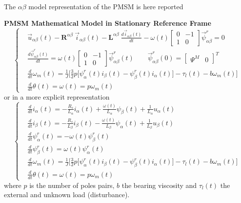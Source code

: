 \documentclass[11pt,a4paper]{scrartcl}
\numberwithin{equation}{section}
\theoremstyle{it}
\theoremstyle{definition}
\begin{document}
\begin{onehalfspace}
The $\alpha\beta$ model representation of the PMSM is here reported
\begin{mybox}
	\textbf{PMSM Mathematical Model in Stationary Reference Frame}
	\begin{equation}\label{pmsm_problem_1_eq_1}
		\left\lbrace \begin{aligned}
			& \vec{u}_{\alpha\beta}(t)-\mathbf{R}^{\alpha\beta}\ 
			\vec{i}_{\alpha\beta}(t)-\mathbf{L}^{\alpha\beta}\ 
			\frac{d\vec{i}_{\alpha\beta}(t)}{dt}-\omega(t) \begin{bmatrix} 
				0 & -1 \\ 1 & 0\end{bmatrix} \vec{\psi}^r_{\alpha\beta} = 0 
			\\[6pt]
			& \frac{d\vec{\psi}^r_{\alpha\beta}(t)}{dt} = \omega(t) 
			\begin{bmatrix} 0 & -1 \\ 1 & 0\end{bmatrix} 
			\vec{\psi}^r_{\alpha\beta}(t) \qquad 
			\vec{\psi}^r_{\alpha\beta}(0) = \begin{bmatrix} \Psi^M &  0 
			\end{bmatrix}^T \\[6pt]
			& \frac{d}{dt}{\omega}_m(t) = 
			\frac{1}{J}\Bigg[\frac{3}{2}p\Big[\psi^r_{\alpha}(t)i_{\beta}(t)-\psi^r_{\beta}(t)i_{\alpha}(t)\Big]
			-\tau_l(t) -b{\omega}_m(t)\Bigg]
			\\[6pt]
			& \frac{d}{dt}{\theta}(t) = \omega(t) = p\omega_m(t)
		\end{aligned} \right. 
	\end{equation}
	or in a more explicit representation
	\begin{equation}\label{pmsm_problem_1_eq_2}
		\left\lbrace \begin{aligned}
			& \frac{d}{dt} i_\alpha(t)= -\frac{R_s}{L_\alpha}i_\alpha(t) 
			+\frac{\omega(t)}{L_\alpha}\psi_\beta(t)+\frac{1}{L_\alpha}u_\alpha(t)
			\\[6pt]
			& \frac{d}{dt} i_\beta(t)= -\frac{R_s}{L_\beta}i_\beta(t) 
			-\frac{\omega(t)}{L_\beta}\psi_\alpha(t)+\frac{1}{L_\beta}u_\beta(t)
			\\[6pt]
			&\frac{d}{dt} \psi_\alpha^r(t) = -\omega(t)\psi_\beta^r(t) \\[6pt]
			&\frac{d}{dt} \psi_\beta^r(t) = \omega(t)\psi_\alpha^r(t) \\[6pt]
			& \frac{d}{dt}{\omega}_m(t) = 
			\frac{1}{J}\Bigg[\frac{3}{2}p\Big[\psi^r_{\alpha}(t)i_{\beta}(t)-\psi^r_{\beta}(t)i_{\alpha}(t)\Big]
			-\tau_l(t) -b{\omega}_m(t)\Bigg]
			\\[6pt]
			& \frac{d}{dt}{\theta}(t) = \omega(t) = p\omega_m(t)
		\end{aligned} \right. 
	\end{equation}
	where $p$ is the number of poles pairs, $b$ the bearing viscosity and 
	$\tau_l(t)$ the external and unknown load (disturbance).
\end{mybox}


\end{onehalfspace}
\end{document}
